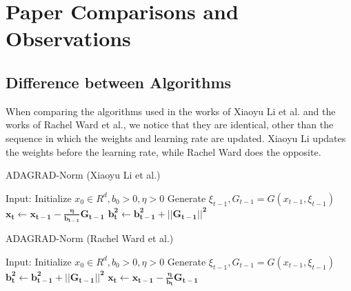 \documentclass[14pt,onecolumn,letterpaper]{extarticle}
\begin{document}
\section{Paper Comparisons and Observations}
\subsection{Difference between Algorithms}
When comparing the algorithms used in the works of Xiaoyu Li et al. and the works of Rachel Ward et al., we notice that they are identical, other than the sequence in which the weights and learning rate are updated. Xiaoyu Li updates the weights before the learning rate, while Rachel Ward does the opposite.
\begin{algorithm}[H]
    \caption{ADAGRAD-Norm (Xiaoyu Li et al.)} 
    \begin{algorithmic}[1]
            \State Input: Initialize $x_0\in \textit{R}^d,b_0>0,\eta>0$
            \State Generate $\xi_{t-1},G_{t-1}=G(x_{t-1},\xi_{t-1})$
                \State $\boldsymbol{x_t\leftarrow x_{t-1}-\frac{\eta}{b_{t-1}}G_{t-1}}$
                \State $\boldsymbol{b_t^2\leftarrow b_{t-1}^2+||G_{t-1}||^2}$
        \EndFor
      \end{algorithmic} 
    \end{algorithm}
\begin{algorithm}[H]
    \caption{ADAGRAD-Norm (Rachel Ward et al.)} 
    \begin{algorithmic}[1]
                \State Input: Initialize $x_0\in \textit{R}^d,b_0>0,\eta>0$
                \State Generate $\xi_{t-1},G_{t-1}=G(x_{t-1},\xi_{t-1})$
                    \State $\boldsymbol{b_t^2\leftarrow b_{t-1}^2+||G_{t-1}||^2}$
                    \State $\boldsymbol{x_t\leftarrow x_{t-1}-\frac{\eta}{b_{t}}G_{t-1}}$
                    
            \EndFor
    \end{algorithmic} 
    \end{algorithm}
\end{document}
